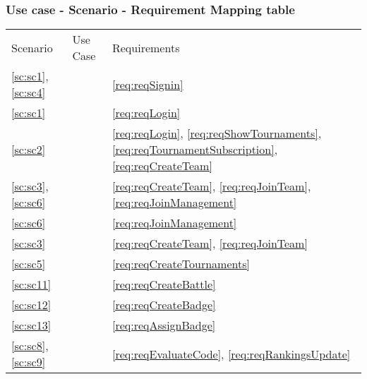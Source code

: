 \subsubsection{Use case - Scenario - Requirement Mapping table}
\begin{center}
    \begin{tabu}{|X[.2]|X[.6]|X[.2]|} \hline \everyrow{\hline}
        Scenario & Use Case & Requirements \\
        \ref{sc:sc1}, \ref{sc:sc4} &  & \ref{req:reqSignin} \\
        \ref{sc:sc1} &  & \ref{req:reqLogin} \\
        \ref{sc:sc2} &  & \ref{req:reqLogin}, \ref{req:reqShowTournaments}, \ref{req:reqTournamentSubscription}, \ref{req:reqCreateTeam}\\
        \ref{sc:sc3}, \ref{sc:sc6} &  & \ref{req:reqCreateTeam}, \ref{req:reqJoinTeam}, \ref{req:reqJoinManagement} \\
        \ref{sc:sc6} &  & \ref{req:reqJoinManagement} \\
        \ref{sc:sc3} &  & \ref{req:reqCreateTeam}, \ref{req:reqJoinTeam} \\
        \ref{sc:sc5} &  & \ref{req:reqCreateTournaments} \\
        \ref{sc:sc11} &  & \ref{req:reqCreateBattle} \\
        \ref{sc:sc12} &  & \ref{req:reqCreateBadge} \\
        \ref{sc:sc13} &  & \ref{req:reqAssignBadge} \\
        \ref{sc:sc8}, \ref{sc:sc9} &  & \ref{req:reqEvaluateCode}, \ref{req:reqRankingsUpdate}\\
    \end{tabu}
\end{center}